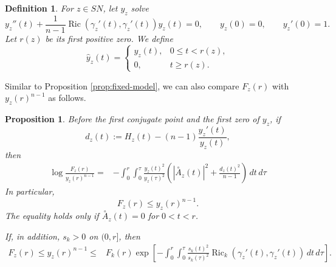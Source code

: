 \documentclass[11pt, reqno]{amsart}
\newtheorem{proposition}{Proposition}
\newtheorem{definition}{Definition}
\begin{document}
\begin{definition}\label{def:scalar-jacobi}
For $z\in SN$, let $y_z$ solve
\begin{equation}\label{eq:scalar-jacobi}
y_z''(t)+\frac{1}{n-1} \operatorname{Ric}(\gamma_z'(t), \gamma_z'(t))y_z(t)=0, \qquad y_z(0)=0, \qquad y_z'(0)=1.
\end{equation}
Let $r(z)$ be its first positive zero. We define
$$
\widehat y_z(t)=
\begin{cases}
y_z(t), & 0\le t<r(z), \\
0, & t\ge r(z).
\end{cases}
$$
\end{definition}
Similar to Proposition \ref{prop:fixed-model}, we can also compare $F_z(r)$ with $y_z(r)^{n-1}$ as follows.
\begin{proposition}\label{prop:adapted}
Before the first conjugate point and the first zero of $y_z$, if
$$
d_z(t):= H_z(t)-(n-1)\frac{y_z'(t)}{y_z(t)},
$$
then
\begin{align}
\label{eq:exact-shear}
\log\frac{F_z(r)}{y_z(r)^{n-1}}
=& -\int_0^r\int_0^\tau \frac{y_z(t)^2}{y_z(\tau)^2} \left(\left|\stackrel{\circ}{A}_z(t)\right|^2 +\frac{d_z(t)^2}{n-1} \right) \, dt\, d\tau
\end{align}
In particular,
\begin{equation}\label{eq:adapted-first}
F_z(r)\le y_z(r)^{n-1}.
\end{equation}
The equality holds only if $\stackrel \circ A_z(t)=0$ for $0<t<r$.

If, in addition, $s_k>0$ on $(0, r]$, then
\begin{align} \label{eq:comparison-hierarchy}
F_z(r) \le y_z(r)^{n-1}
\le & F_k(r) \exp\left[-\int_0^r\int_0^\tau \frac{s_k(t)^2}{s_k(\tau)^2} \operatorname{Ric}_k \left(\gamma_z'(t), \gamma_z'(t)\right) \, dt\, d\tau \right].
\end{align}
\end{proposition}
\end{document}
